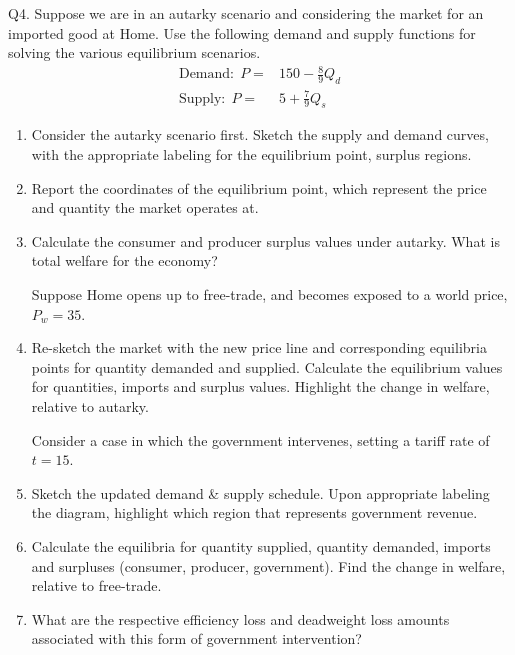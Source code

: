 \documentclass[12pt]{article}
\begin{document}
\newpage

\noindent Q4. Suppose we are in an autarky scenario and considering the market for an imported good at Home. 
Use the following demand and supply functions for solving the various equilibrium scenarios.
\begin{align*}
\text{Demand:} \ \  P = & 150 - \frac{8}{9} Q_d\\
\text{Supply:}\ \  P = & 5  + \frac{7}{9} Q_s
\end{align*}

\begin{enumerate}[1)]
	\item Consider the autarky scenario first. Sketch the supply and demand curves, with the appropriate labeling for the equilibrium point, surplus regions.
	
	\vspace{2.4in}
	
	\item Report the coordinates of the equilibrium point, which represent the price and quantity the market operates at.
	
	\vspace{1in}
	
	\item Calculate the consumer and producer surplus values under autarky.  What is total welfare for the economy?
	
	\vspace{1.4in}
	
	\noindent Suppose Home opens up to free-trade, and becomes exposed to a world price, $P_w = 35$. 
	
	\item Re-sketch the market with the new price line and corresponding equilibria points for quantity demanded and supplied. 
	Calculate the equilibrium values for quantities, imports and surplus values. 
	Highlight the change in welfare, relative to autarky. 
	
	\vspace{3in}
	
	\noindent Consider a case in which the government intervenes, setting a tariff rate of $t=15$. 
	
	\item Sketch the updated demand \& supply schedule. Upon appropriate labeling the diagram, highlight which region that represents government revenue.
	
	\vspace{3.5in}
	
	\item Calculate the equilibria for quantity supplied, quantity demanded, imports and surpluses (consumer, producer, government). 
	Find the change in welfare, relative to free-trade. 
	
	\vspace{2in}

	\item What are the respective efficiency loss and deadweight loss amounts associated with this form of government intervention?
	
\end{enumerate}
\end{document}
